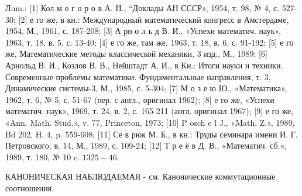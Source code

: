 \documentclass[10pt]{article}
\begin{document}
Лum.: [1] Кол м о г о р о в А. Н., “Доклады АН СССР», 1954, т. 98, № 4, с. 527-30; [2] е го же, в кн.: Международный математический конгресс в Амстердаме, 1954, М., 1961, с. 187-208; [3] А рн о л ь д В. И., «Успехи математич. наук», 1963, т. 18, в. 5, с. 13-40; [4] е го же, там же, 1963, т. 18, в. 6, с. 91-192; [5] е го же, Математические методы классической механики, 3 изд., М., 1989; [6] Арнольд В. И., Козлов В. В., Нейштадт А. И., в Кн.: Итоги науки и техники. Современные проблемы математики. Фундаментальные направления, т. 3, Динамические системы-3, М., 1985, с. 5-304; [7] М о з е ю Ю., «Математика», 1962, т. 6, № 5, с. 51-67 (пер. с англ., оригинал 1962); [8] е го же, «Успехи математич. наук», 1969, т. 24, в. 2, с. 165-211 (англ. оригинал 1967); [9] е го же, «Ann. Math. Stud.», v. 77, Princeton, 1973; [10] P osch e l J., «Math. Z.», 1989, Bd 202, Н. 4, p. 559-608; [11] Се в рюк М. Б., в кн.: Труды семинара имени И. Г. Петровского, в. 14, М., 1989, с. 109-24; [12] Т р е ё в Д. В., «Математич. сб.», 1989, т. 180, № 10 c. $1325-46$.



КАНОНИЧЕСКАЯ НАБЛЮДАЕМАЯ - см. Канонические коммутационные соотношения.
\end{document}
